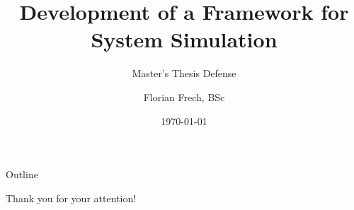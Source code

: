 \documentclass[aspectratio=169]{beamer}
\title[SysSimX]{Development of a Framework for System Simulation}
\subtitle{Master's Thesis Defense}
\author[F. Frech]{Florian Frech, BSc}
\institute[TU Wien]{Institute of Lightweight Design and Structural Biomechanics \\ TU Wien}
\date{\today}
\begin{document}
\begin{frame}
  \titlepage
\end{frame}

\begin{frame}{Outline}
  \tableofcontents[hidesubsections]
\end{frame}









\begin{frame}{}
  \vspace{1cm}
  \centering \Huge
  Thank you for your attention!
\end{frame}

\appendix

\end{document}
